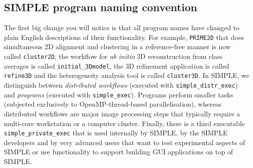 \documentclass[a4paper,11pt]{article}
\newcommand{\prgname}[1]{\textcolor{NavyBlue}{\texttt{#1}}}
\begin{document}
\subsection{SIMPLE program naming convention}
The first big change you will notice is that all program names have changed to plain English descriptions of their functionality.  For example, \prgname{PRIME2D} that does simultaneous 2D alignment and clustering in a reference-free manner is now called \prgname{cluster2D}, the workflow for \textit{ab initio} 3D reconstruction from class averages is called \prgname{initial\_3Dmodel}, the 3D refinement application is called \prgname{refine3D} and the heterogeneity analysis tool is called \prgname{cluster3D}. In SIMPLE, we distinguish between \textit{distributed workflows} (executed with \texttt{simple\_distr\_exec}) and \textit{programs} (executed with \texttt{simple\_exec}). Programs perform smaller tasks (subjected exclusively to OpenMP-thread-based parallelisation), whereas distributed workflows are major image processing steps that typically require a multi-core workstation or a computer cluster. Finally, there is a third executable \texttt{simple\_private\_exec} that is used internally by SIMPLE, by the SIMPLE developers and by very advanced users that want to test experimental aspects of SIMPLE or use functionality to support building GUI applications on top of SIMPLE.
\end{document}
